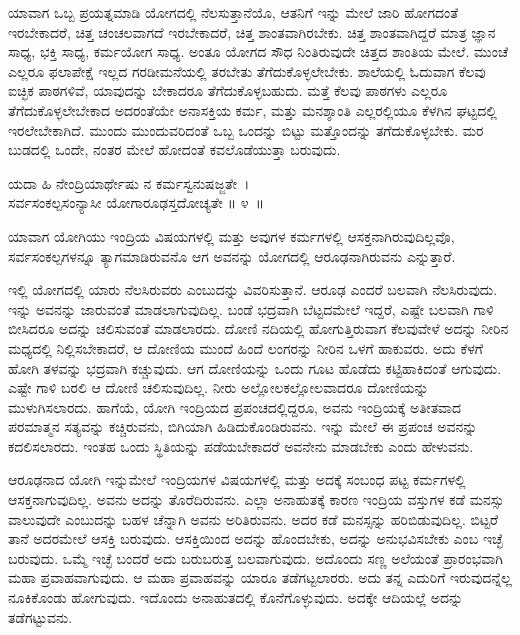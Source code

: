 ಯಾವಾಗ ಒಬ್ಬ ಪ್ರಯತ್ನಮಾಡಿ ಯೋಗದಲ್ಲಿ ನೆಲಸುತ್ತಾನೆಯೊ, ಆತನಿಗೆ ಇನ್ನು ಮೇಲೆ ಜಾರಿ ಹೋಗದಂತೆ ಇರಬೇಕಾದರೆ, ಚಿತ್ತ ಚಂಚಲವಾಗದೆ ಇರಬೇಕಾದರೆ, ಚಿತ್ತ ಶಾಂತವಾಗಿರಬೇಕು. ಚಿತ್ತ ಶಾಂತವಾಗಿದ್ದರೆ ಮಾತ್ರ ಜ್ಞಾನ ಸಾಧ್ಯ, ಭಕ್ತಿ ಸಾಧ್ಯ, ಕರ್ಮಯೋಗ ಸಾಧ್ಯ. ಅಂತೂ ಯೋಗದ ಸೌಧ ನಿಂತಿರುವುದೇ ಚಿತ್ತದ ಶಾಂತಿಯ ಮೇಲೆ. ಮುಂಚೆ ಎಲ್ಲರೂ ಫಲಾಪೇಕ್ಷೆ ಇಲ್ಲದ ಗರಡೀಮನೆಯಲ್ಲಿ ತರಬೇತು ತೆಗೆದುಕೊಳ್ಳಲೇಬೇಕು. ಶಾಲೆಯಲ್ಲಿ ಓದುವಾಗ ಕೆಲವು ಐಚ್ಛಿಕ ಪಾಠಗಳಿವೆ, ಯಾವುದನ್ನು ಬೇಕಾದರೂ ತೆಗೆದುಕೊಳ್ಳಬಹುದು. ಮತ್ತೆ ಕೆಲವು ಪಾಠಗಳು ಎಲ್ಲರೂ ತೆಗೆದುಕೊಳ್ಳಲೇಬೇಕಾದ ಅದರಂತೆಯೇ ಅನಾಸಕ್ತಿಯ ಕರ್ಮ, ಮತ್ತು ಮನಶ್ಶಾಂತಿ ಎಲ್ಲರಲ್ಲಿಯೂ ಕೆಳಗಿನ ಘಟ್ಟದಲ್ಲಿ ಇರಲೇಬೇಕಾಗಿದೆ. ಮುಂದು ಮುಂದುವರಿದಂತೆ ಒಬ್ಬ ಒಂದನ್ನು ಬಿಟ್ಟು ಮತ್ತೊಂದನ್ನು ತಗೆದುಕೊಳ್ಳಬೇಕು. ಮರ ಬುಡದಲ್ಲಿ ಒಂದೇ, ನಂತರ ಮೇಲೆ ಹೋದಂತೆ ಕವಲೊಡೆಯುತ್ತಾ ಬರುವುದು.

\begin{shloka}
ಯದಾ ಹಿ ನೇಂದ್ರಿಯಾರ್ಥೇಷು ನ ಕರ್ಮಸ್ವನುಷಜ್ಜತೇ~।\\ಸರ್ವಸಂಕಲ್ಪಸಂನ್ಯಾಸೀ ಯೋಗಾರೂಢಸ್ತದೋಚ್ಯತೇ \hfill॥ ೪~॥
\end{shloka}

\begin{artha}
ಯಾವಾಗ ಯೋಗಿಯು ಇಂದ್ರಿಯ ವಿಷಯಗಳಲ್ಲಿ ಮತ್ತು ಅವುಗಳ ಕರ್ಮಗಳಲ್ಲಿ ಆಸಕ್ತನಾಗಿರು\-ವುದಿಲ್ಲವೊ, ಸರ್ವಸಂಕಲ್ಪಗಳನ್ನೂ ತ್ಯಾಗಮಾಡಿರುವನೊ ಆಗ ಅವನನ್ನು ಯೋಗದಲ್ಲಿ ಆರೂಢ\-ನಾಗಿರುವನು ಎನ್ನುತ್ತಾರೆ.
\end{artha}

ಇಲ್ಲಿ ಯೋಗದಲ್ಲಿ ಯಾರು ನೆಲಸಿರುವರು ಎಂಬುದನ್ನು ವಿವರಿಸುತ್ತಾನೆ. ಆರೂಢ ಎಂದರೆ ಬಲವಾಗಿ ನೆಲಸಿರುವುದು. ಇನ್ನು ಅವನನ್ನು ಜಾರುವಂತೆ ಮಾಡಲಾಗುವುದಿಲ್ಲ. ಬಂಡೆ ಭದ್ರವಾಗಿ ಬೆಟ್ಟದಮೇಲೆ ಇದ್ದರೆ, ಎಷ್ಟೇ ಬಲವಾಗಿ ಗಾಳಿ ಬೀಸಿದರೂ ಅದನ್ನು ಚಲಿಸುವಂತೆ ಮಾಡಲಾರದು. ದೋಣಿ ನದಿಯಲ್ಲಿ ಹೋಗುತ್ತಿರುವಾಗ ಕೆಲವುವೇಳೆ ಅದನ್ನು ನೀರಿನ ಮಧ್ಯದಲ್ಲಿ ನಿಲ್ಲಿಸಬೇಕಾದರೆ, ಆ ದೋಣಿಯ ಮುಂದೆ ಹಿಂದೆ ಲಂಗರನ್ನು ನೀರಿನ ಒಳಗೆ ಹಾಕುವರು. ಅದು ಕೆಳಗೆ ಹೋಗಿ ತಳವನ್ನು ಭದ್ರವಾಗಿ ಕಚ್ಚುವುದು. ಆಗ ದೋಣಿಯನ್ನು ಒಂದು ಗೂಟ ಹೊಡೆದು ಕಟ್ಟಿಹಾಕಿದಂತೆ ಆಗುವುದು. ಎಷ್ಟೇ ಗಾಳಿ ಬರಲಿ ಆ ದೋಣಿ ಚಲಿಸುವುದಿಲ್ಲ. ನೀರು ಅಲ್ಲೋಲಕಲ್ಲೋಲವಾದರೂ ದೋಣಿಯನ್ನು ಮುಳುಗಿಸಲಾರದು. ಹಾಗೆಯೆ, ಯೋಗಿ ಇಂದ್ರಿಯದ ಪ್ರಪಂಚದಲ್ಲಿದ್ದರೂ, ಅವನು ಇಂದ್ರಿಯಕ್ಕೆ ಅತೀತವಾದ ಪರಮಾತ್ಮನ ಸತ್ಯವನ್ನು ಕಚ್ಚಿರುವನು, ಬಿಗಿಯಾಗಿ ಹಿಡಿದುಕೊಂಡಿರುವನು. ಇನ್ನು ಮೇಲೆ ಈ ಪ್ರಪಂಚ ಅವನನ್ನು ಕದಲಿಸಲಾರದು. ಇಂತಹ ಒಂದು ಸ್ಥಿತಿಯನ್ನು ಪಡೆಯಬೇಕಾದರೆ ಅವನೇನು ಮಾಡಬೇಕು ಎಂದು ಹೇಳುವನು.

ಆರೂಢನಾದ ಯೋಗಿ ಇನ್ನುಮೇಲೆ ಇಂದ್ರಿಯಗಳ ವಿಷಯಗಳಲ್ಲಿ ಮತ್ತು ಅದಕ್ಕೆ ಸಂಬಂಧ ಪಟ್ಟ ಕರ್ಮಗಳಲ್ಲಿ ಆಸಕ್ತನಾಗುವುದಿಲ್ಲ. ಅವನು ಅದನ್ನು ತೊರೆದಿರುವನು. ಎಲ್ಲಾ ಅನಾಹುತಕ್ಕೆ ಕಾರಣ ಇಂದ್ರಿಯ ವಸ್ತುಗಳ ಕಡೆ ಮನಸ್ಸು ವಾಲುವುದೇ ಎಂಬುದನ್ನು ಬಹಳ ಚೆನ್ನಾಗಿ ಅವನು ಅರಿತಿರುವನು. ಅದರ ಕಡೆ ಮನಸ್ಸನ್ನು ಹರಿಬಿಡುವುದಿಲ್ಲ. ಬಿಟ್ಟರೆ ತಾನೆ ಅದರಮೇಲೆ ಆಸಕ್ತಿ ಬರುವುದು. ಆಸಕ್ತಿಯಿಂದ ಅದನ್ನು ಹೊಂದಬೇಕು, ಅದನ್ನು ಅನುಭವಿಸಬೇಕು ಎಂಬ ಇಚ್ಛೆ ಬರುವುದು. ಒಮ್ಮೆ ಇಚ್ಛೆ ಬಂದರೆ ಅದು ಬರುಬರುತ್ತ ಬಲವಾಗುವುದು. ಅದೊಂದು ಸಣ್ಣ ಅಲೆಯಂತೆ ಪ್ರಾರಂಭವಾಗಿ ಮಹಾ ಪ್ರವಾಹವಾಗುವುದು. ಆ ಮಹಾ ಪ್ರವಾಹವನ್ನು ಯಾರೂ ತಡೆಗಟ್ಟಲಾರರು. ಅದು ತನ್ನ ಎದುರಿಗೆ ಇರುವುದನ್ನೆಲ್ಲ ನೂಕಿಕೊಂಡು ಹೋಗುವುದು. ಇದೊಂದು ಅನಾಹುತದಲ್ಲಿ ಕೊನೆಗೊಳ್ಳುವುದು. ಅದಕ್ಕೇ ಆದಿಯಲ್ಲೆ ಅದನ್ನು ತಡೆಗಟ್ಟುವನು.

